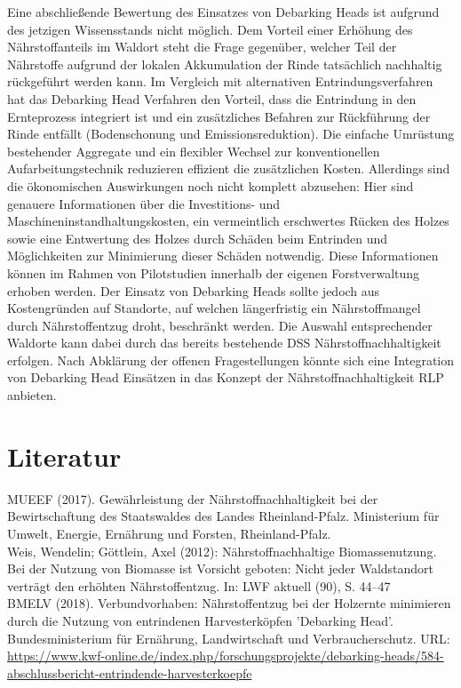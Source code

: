 \documentclass[a4paper, 11pt, titlepage]{scrartcl} %
\begin{document}
Eine abschließende Bewertung des Einsatzes von Debarking Heads ist aufgrund des jetzigen Wissensstands nicht möglich. Dem Vorteil einer Erhöhung des Nährstoffanteils im Waldort steht die Frage gegenüber, welcher Teil der Nährstoffe aufgrund der lokalen Akkumulation der Rinde tatsächlich nachhaltig rückgeführt werden kann. Im Vergleich mit alternativen Entrindungsverfahren hat das Debarking Head Verfahren den Vorteil, dass die Entrindung in den Ernteprozess integriert ist und ein zusätzliches Befahren zur Rückführung der Rinde entfällt (Bodenschonung und Emissionsreduktion). Die einfache Umrüstung bestehender Aggregate und ein flexibler Wechsel zur konventionellen Aufarbeitungstechnik reduzieren effizient die zusätzlichen Kosten. Allerdings sind die ökonomischen Auswirkungen noch nicht komplett abzusehen: Hier sind genauere Informationen über die Investitions- und Maschineninstandhaltungskosten, ein vermeintlich erschwertes Rücken des Holzes sowie eine Entwertung des Holzes durch Schäden beim Entrinden und Möglichkeiten zur Minimierung dieser Schäden notwendig. Diese Informationen können im Rahmen von Pilotstudien innerhalb der eigenen Forstverwaltung erhoben werden. Der Einsatz von Debarking Heads sollte jedoch aus Kostengründen auf Standorte, auf welchen längerfristig ein Nährstoffmangel durch Nährstoffentzug droht, beschränkt werden. Die Auswahl entsprechender Waldorte kann dabei durch das bereits bestehende DSS Nährstoffnachhaltigkeit erfolgen. Nach Abklärung der offenen Fragestellungen könnte sich eine Integration von Debarking Head Einsätzen in das Konzept der Nährstoffnachhaltigkeit RLP anbieten.\\


\section*{Literatur}

\noindent [1] MUEEF (2017). Gewährleistung der Nährstoffnachhaltigkeit bei der Bewirtschaftung des Staatswaldes des Landes Rheinland-Pfalz. Ministerium für Umwelt, Energie, Ernährung und Forsten, Rheinland-Pfalz.\\

\noindent [2] Weis,  Wendelin;  Göttlein,  Axel  (2012):  Nährstoffnachhaltige  Biomassenutzung.  Bei  der 
Nutzung von Biomasse ist Vorsicht geboten: Nicht jeder Waldstandort verträgt den erhöhten 
Nährstoffentzug. In: LWF aktuell (90), S. 44–47\\

\noindent [3] BMELV (2018). Verbundvorhaben: Nährstoffentzug bei der Holzernte minimieren durch die Nutzung von entrindenen Harvesterköpfen 'Debarking Head'. Bundesministerium für Ernährung, Landwirtschaft und Verbraucherschutz. URL: \url{https://www.kwf-online.de/index.php/forschungsprojekte/debarking-heads/584-abschlussbericht-entrindende-harvesterkoepfe}\\
\end{document}
